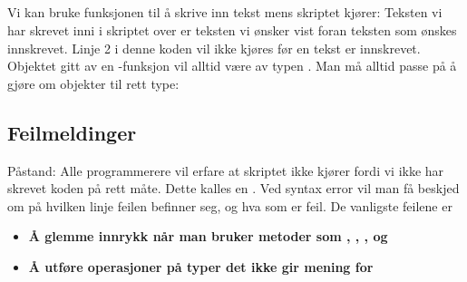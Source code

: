 \subsection{}
Vi kan bruke funksjonen  til å skrive inn tekst mens skriptet kjører:
Teksten vi har skrevet inni  i skriptet over er teksten vi ønsker vist foran teksten som ønskes innskrevet. Linje 2 i denne koden vil ikke kjøres før en tekst er innskrevet.
\newpage
Objektet gitt av en -funksjon vil alltid være av typen . Man må alltid passe på å gjøre om objekter til rett type:
\subsection{Feilmeldinger}
Påstand: Alle programmerere vil erfare at skriptet ikke kjører fordi vi ikke har skrevet koden på rett måte. Dette kalles en . Ved syntax error vil man få beskjed om på hvilken linje feilen befinner seg, og hva som er feil. De vanligste feilene er
\begin{itemize}
\item \textbf{Å glemme innrykk når man bruker metoder som , , , og  }
\item \textbf{Å utføre operasjoner på typer det ikke gir mening for}
\end{itemize}

\newpage



